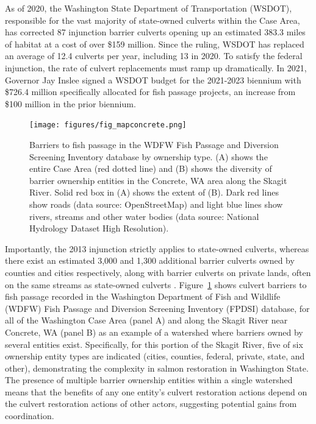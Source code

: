 As of 2020, the Washington State Department of Transportation (WSDOT), responsible for the vast majority of state-owned culverts within the Case Area, has corrected 87 injunction barrier culverts opening up an estimated 383.3 miles of habitat at a cost of over \$159 million. Since the ruling, WSDOT has replaced an average of 12.4 culverts per year, including 13 in 2020. To satisfy the federal injunction, the rate of culvert replacements must ramp up dramatically. In 2021, Governor Jay Inslee signed a WSDOT budget for the 2021-2023 biennium with \$726.4 million specifically allocated for fish passage projects, an increase from \$100 million in the prior biennium.


\begin{figure}
\texttt{[image: figures/fig\_mapconcrete.png]}
\caption{Barriers to fish passage in the WDFW Fish Passage and Diversion Screening Inventory database by ownership type. (A) shows the entire Case Area (red dotted line) and (B) shows the diversity of barrier ownership entities in the Concrete, WA area along the Skagit River. Solid red box in (A) shows the extent of (B). Dark red lines show roads (data source: OpenStreetMap) and light blue lines show rivers, streams and other water bodies (data source: National Hydrology Dataset High Resolution).\label{fig:barrierMap}}
\end{figure}%

Importantly, the 2013 injunction strictly applies to state-owned culverts, whereas there exist an estimated 3,000 and 1,300 additional barrier culverts owned by counties and cities respectively, along with barrier culverts on private lands, often on the same streams as state-owned culverts \citep{brown_coming_2019}. Figure~\ref{fig:barrierMap} shows culvert barriers to fish passage recorded in the Washington Department of Fish and Wildlife (WDFW) Fish Passage and Diversion Screening Inventory (FPDSI) database, for all of the Washington Case Area (panel A) and along the Skagit River near Concrete, WA (panel B) as an example of a watershed where barriers owned by several entities exist. Specifically, for this portion of the Skagit River, five of six ownership entity types are indicated (cities, counties, federal, private, state, and other), demonstrating the complexity in salmon restoration in Washington State. The presence of multiple barrier ownership entities within a single watershed means that the benefits of any one entity's culvert restoration actions depend on the culvert restoration actions of other actors, suggesting potential gains from coordination. 

